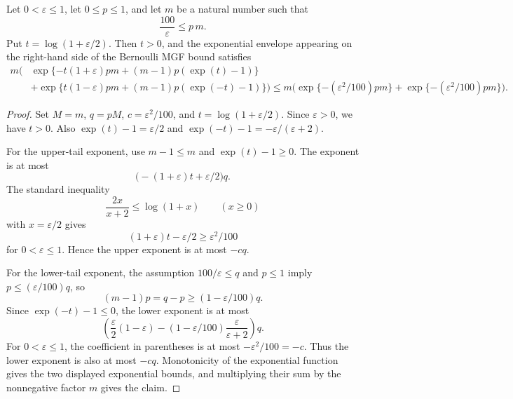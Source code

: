 \begin{lemma}
Let \(0<\varepsilon\leq 1\), let \(0\leq p\leq 1\), and let \(m\) be a
natural number such that
\[
  \frac{100}{\varepsilon}\leq p\,m .
\]
Put \(t=\log(1+\varepsilon/2)\).  Then \(t>0\), and the exponential envelope
appearing on the right-hand side of the Bernoulli MGF bound satisfies
\[
\begin{aligned}
m\Big(&\exp\{-t(1+\varepsilon)pm
      +(m-1)p(\exp(t)-1)\}\\
&+\exp\{t(1-\varepsilon)pm
      +(m-1)p(\exp(-t)-1)\}\Big)
\leq
m\Big(\exp\{-(\varepsilon^2/100)pm\}
     +\exp\{-(\varepsilon^2/100)pm\}\Big).
\end{aligned}
\]
\end{lemma}
\begin{proof}
Set \(M=m\), \(q=pM\), \(c=\varepsilon^2/100\), and
\(t=\log(1+\varepsilon/2)\).  Since \(\varepsilon>0\), we have \(t>0\).
Also \(\exp(t)-1=\varepsilon/2\) and
\(\exp(-t)-1=-\varepsilon/(\varepsilon+2)\).

For the upper-tail exponent, use \(m-1\leq m\) and
\(\exp(t)-1\geq0\).  The exponent is at most
\[
\bigl(-(1+\varepsilon)t+\varepsilon/2\bigr)q.
\]
The standard inequality
\[
\frac{2x}{x+2}\leq \log(1+x)\qquad (x\geq0)
\]
with \(x=\varepsilon/2\) gives
\[
(1+\varepsilon)t-\varepsilon/2\geq \varepsilon^2/100
\]
for \(0<\varepsilon\leq1\).  Hence the upper exponent is at most \(-cq\).

For the lower-tail exponent, the assumption \(100/\varepsilon\leq q\) and
\(p\leq1\) imply \(p\leq(\varepsilon/100)q\), so
\[
(m-1)p=q-p\geq(1-\varepsilon/100)q.
\]
Since \(\exp(-t)-1\leq0\), the lower exponent is at most
\[
\left(\frac{\varepsilon}{2}(1-\varepsilon)
  -(1-\varepsilon/100)\frac{\varepsilon}{\varepsilon+2}\right)q.
\]
For \(0<\varepsilon\leq1\), the coefficient in parentheses is at most
\(-\varepsilon^2/100=-c\).  Thus the lower exponent is also at most \(-cq\).
Monotonicity of the exponential function gives the two displayed exponential
bounds, and multiplying their sum by the nonnegative factor \(m\) gives the
claim.
\end{proof}
